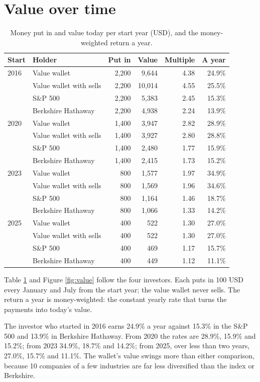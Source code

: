 \documentclass[11pt,a4paper]{article}
\begin{document}
\section{Value over time}
\begin{table}[H]
\centering
\small
\caption{Money put in and value today per start year (USD), and the money-weighted return a year.}\label{tab:value}
\begin{tabular}{l l r r r r}
\hline
Start & Holder & Put in & Value & Multiple & A year \\
\hline
2016 & Value wallet & 2,200 & 9,644 & 4.38 & 24.9\% \\
 & Value wallet with sells & 2,200 & 10,014 & 4.55 & 25.5\% \\
 & S\&P 500 & 2,200 & 5,383 & 2.45 & 15.3\% \\
 & Berkshire Hathaway & 2,200 & 4,938 & 2.24 & 13.9\% \\
\hline
2020 & Value wallet & 1,400 & 3,947 & 2.82 & 28.9\% \\
 & Value wallet with sells & 1,400 & 3,927 & 2.80 & 28.8\% \\
 & S\&P 500 & 1,400 & 2,480 & 1.77 & 15.9\% \\
 & Berkshire Hathaway & 1,400 & 2,415 & 1.73 & 15.2\% \\
\hline
2023 & Value wallet & 800 & 1,577 & 1.97 & 34.9\% \\
 & Value wallet with sells & 800 & 1,569 & 1.96 & 34.6\% \\
 & S\&P 500 & 800 & 1,164 & 1.46 & 18.7\% \\
 & Berkshire Hathaway & 800 & 1,066 & 1.33 & 14.2\% \\
\hline
2025 & Value wallet & 400 & 522 & 1.30 & 27.0\% \\
 & Value wallet with sells & 400 & 522 & 1.30 & 27.0\% \\
 & S\&P 500 & 400 & 469 & 1.17 & 15.7\% \\
 & Berkshire Hathaway & 400 & 449 & 1.12 & 11.1\% \\
\hline
\end{tabular}
\end{table}
Table \ref{tab:value} and Figure \ref{fig:value} follow the four investors. Each puts in 100 USD every January and July from the start year; the value wallet never sells. The return a year is money-weighted: the constant yearly rate that turns the payments into today's value.

The investor who started in 2016 earns 24.9\% a year against 15.3\% in the S\&P 500 and 13.9\% in Berkshire Hathaway. From 2020 the rates are 28.9\%, 15.9\% and 15.2\%; from 2023 34.9\%, 18.7\% and 14.2\%; from 2025, over less than two years, 27.0\%, 15.7\% and 11.1\%. The wallet's value swings more than either comparison, because 10 companies of a few industries are far less diversified than the index or Berkshire.
\end{document}
